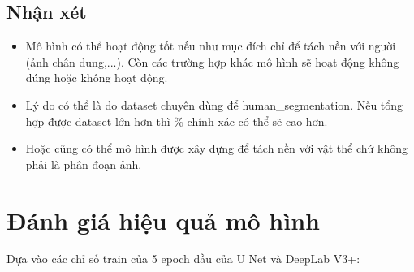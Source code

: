 \documentclass[12pt]{report}
\begin{document}
\subsection*{Nhận xét}
\begin{itemize}
    \item Mô hình có thể hoạt động tốt nếu như mục đích chỉ để tách nền với người (ảnh chân dung,...). Còn các trường hợp khác mô hình sẽ hoạt động không đúng hoặc không hoạt động.
    \item Lý do có thể là do dataset chuyên dùng để human\_segmentation. Nếu tổng hợp được dataset lớn hơn thì \% chính xác có thể sẽ cao hơn.
    \item Hoặc cũng có thể mô hình được xây dựng để tách nền với vật thể chứ không phải là phân đoạn ảnh.
\end{itemize}

\section*{Đánh giá hiệu quả mô hình}

Dựa vào các chỉ số train của 5 epoch đầu của U Net và DeepLab V3+:
\end{document}
